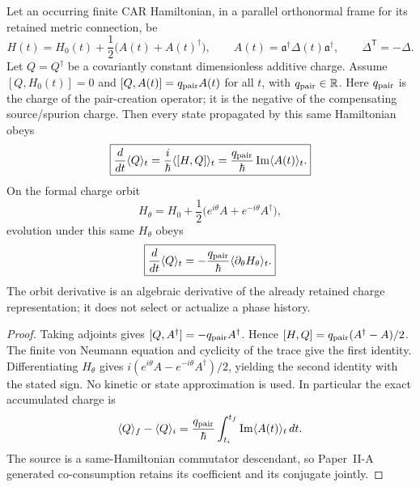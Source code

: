 \documentclass[12pt,a4paper]{article}
\begin{document}
\begin{theorem}
\label{p4:thm:v4102-pair-charge-source}
Let an occurring finite CAR Hamiltonian, in a parallel orthonormal frame for
its retained metric connection, be
\[
 H(t)=H_0(t)+\frac12\bigl(A(t)+A(t)^\dagger\bigr),
 \qquad A(t)=\mathfrak a^\dagger\Delta(t)\mathfrak a^\dagger,
 \qquad \Delta^{\mathsf T}=-\Delta.
\]
Let $Q=Q^\dagger$ be a covariantly constant dimensionless additive charge.
Assume $[Q,H_0(t)]=0$ and $[Q,A(t)]=q_{\rm pair}A(t)$ for all $t$,
with $q_{\rm pair}\in\mathbb R$.
Here $q_{\rm pair}$ is the charge of the pair-creation operator; it is the
negative of the compensating source/spurion charge.  Then every state
propagated by this same Hamiltonian obeys
\begin{equation}
\label{p4:eq:v4102-exact-pair-charge-source}
 \boxed{
 \frac{d}{dt}\langle Q\rangle_t
 =\frac{i}{\hbar}\langle[H,Q]\rangle_t
 =\frac{q_{\rm pair}}{\hbar}\operatorname{Im}\langle A(t)\rangle_t.}
\end{equation}
On the formal charge orbit
\[
 H_\theta=H_0+\frac12
 \bigl(e^{i\theta}A+e^{-i\theta}A^\dagger\bigr),
\]
evolution under this same $H_\theta$ obeys
\begin{equation}
\label{p4:eq:v4102-pair-phase-ward}
 \boxed{
 \frac{d}{dt}\langle Q\rangle_t
 =-\frac{q_{\rm pair}}{\hbar}
   \langle\partial_\theta H_\theta\rangle_t.}
\end{equation}
The orbit derivative is an algebraic derivative of the already retained
charge representation; it does not select or actualize a phase history.
\end{theorem}

\begin{proof}
Taking adjoints gives $[Q,A^\dagger]=-q_{\rm pair}A^\dagger$.
Hence $[H,Q]=q_{\rm pair}(A^\dagger-A)/2$.  The finite von Neumann equation
and cyclicity of the trace give the first identity.  Differentiating
$H_\theta$ gives $i(e^{i\theta}A-e^{-i\theta}A^\dagger)/2$, yielding the
second identity with the stated sign.  No kinetic or state approximation is
used.  In particular the exact accumulated charge is
\[
 \langle Q\rangle_f-\langle Q\rangle_i
 =\frac{q_{\rm pair}}{\hbar}
  \int_{t_i}^{t_f}\operatorname{Im}\langle A(t)\rangle_t\,dt.
\]
The source is a same-Hamiltonian commutator descendant, so Paper~II-A
generated co-consumption retains its coefficient and its conjugate jointly.
\end{proof}
\end{document}
